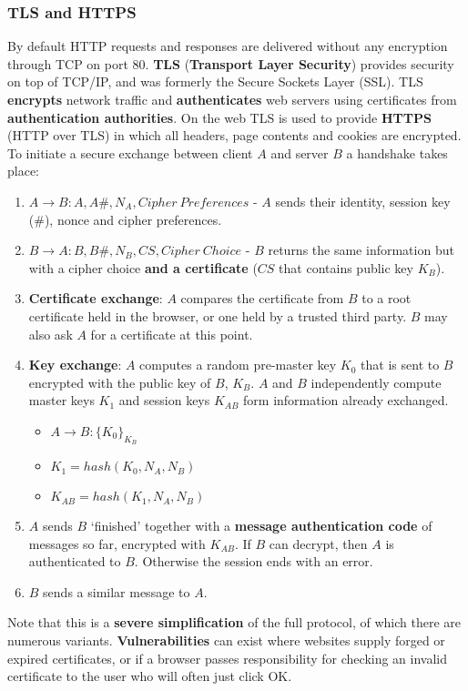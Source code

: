 \documentclass{article}
\newcommand{\np}{\vspace{8pt} \\}
\begin{document}
\subsubsection{TLS and HTTPS}
By default HTTP requests and responses are delivered without any encryption through TCP on port 80. \textbf{TLS} (\textbf{Transport Layer Security}) provides security on top of TCP/IP, and was formerly the Secure Sockets Layer (SSL). TLS \textbf{encrypts} network traffic and \textbf{authenticates} web servers using certificates from \textbf{authentication authorities}. On the web TLS is used to provide \textbf{HTTPS} (HTTP over TLS) in which all headers, page contents and cookies are encrypted. \np
To initiate a secure exchange between client $ A $ and server $ B $ a handshake takes place:
\begin{enumerate}
	\item $ A \rightarrow B : A, A\#, N_{A}, Cipher\ Preferences $ - $ A $ sends their identity, session key (\#), nonce and cipher preferences.
	\item $ B \rightarrow A : B, B\#, N_{B}, CS, Cipher\ Choice $ - $ B $ returns the same information but with a cipher choice \textbf{and a certificate} ($ CS $ that contains public key $ K_{B} $).
	\item \textbf{Certificate exchange}: $ A $ compares the certificate from $ B $ to a root certificate held in the browser, or one held by a trusted third party. $ B $ may also ask $ A $ for a certificate at this point.
	\item \textbf{Key exchange}: $ A $ computes a random pre-master key $ K_{0} $ that is sent to $ B $ encrypted with the public key of $ B $, $ K_{B} $. $ A $ and $ B $ independently compute master keys $ K_{1} $ and session keys $ K_{AB} $ form information already exchanged.
	\begin{itemize}
		\item $ A \rightarrow B : \{ K_{0} \}_{K_{B}} $
		\item $ K_{1} = hash(K_{0}, N_{A}, N_{B}) $
		\item $ K_{AB} = hash(K_{1}, N_{A}, N_{B}) $
	\end{itemize}
	\item $ A $ sends $ B $ `finished' together with a \textbf{message authentication code} of messages so far, encrypted with $ K_{AB} $. If $ B $ can decrypt, then $ A $ is authenticated to $ B $. Otherwise the session ends with an error.
	\item $ B $ sends a similar message to $ A $.
\end{enumerate}
Note that this is a \textbf{severe simplification} of the full protocol, of which there are numerous variants. \textbf{Vulnerabilities} can exist where websites supply forged or expired certificates, or if a browser passes responsibility for checking an invalid certificate to the user who will often just click OK.
\end{document}
